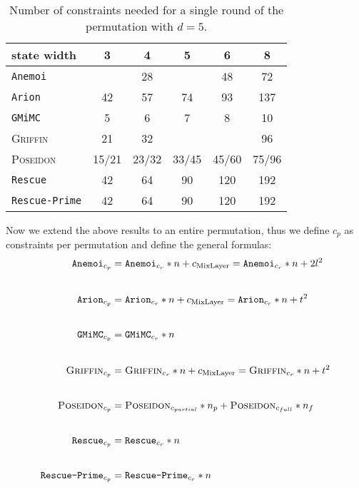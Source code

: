 \documentclass[12pt, a4paper]{report}
\begin{document}
\begin{table}[H]
  \caption{Number of constraints needed for a single round of the permutation with $d = 5$.}\label{tab:constraintsround}
  \begin{center}
    \begin{tabular}{|l|c|c|c|c|c|}
      \hline
        state width & 3 & 4 & 5 & 6 & 8 \\
      \hline
        \texttt{Anemoi} & & 28 &  & 48 & 72 \\
        \texttt{Arion} & 42 & 57 & 74 & 93 & \cellcolor{orange!35} 137 \\
        \texttt{GMiMC} & \cellcolor{green!35} 5 & 6 & 7 & 8 & 10 \\
        \textsc{Griffin} & 21 & 32 & & & 96 \\
        \textsc{Poseidon} & 15/21 & 23/32 & 33/45 & 45/60 & 75/96 \\
        \texttt{Rescue} & 42 & 64 & 90 & \cellcolor{orange!35} 120 & \cellcolor{red!35} 192 \\
        \texttt{Rescue-Prime} & 42 & 64 & 90 & \cellcolor{orange!35} 120 & \cellcolor{red!35} 192 \\
      \hline
    \end{tabular}
  \end{center}
\end{table}

Now we extend the above results to an entire permutation, thus we define $c_p$ as constraints per permutation and define the general formulas:
\begin{align*}
  \texttt{Anemoi}_{c_p} &= \texttt{Anemoi}_{c_r} * n + c_{\text{MixLayer}} = \texttt{Anemoi}_{c_r} * n + 2l^2 \\[20pt]
  \texttt{Arion}_{c_p} &= \texttt{Arion}_{c_r} * n + c_{\text{MixLayer}} = \texttt{Arion}_{c_r} * n + t^2 \\[20pt]
  \texttt{GMiMC}_{c_p} &= \texttt{GMiMC}_{c_r} * n \\[20pt]
  \textsc{Griffin}_{c_p} &= \textsc{Griffin}_{c_r} * n + c_{\text{MixLayer}} = \textsc{Griffin}_{c_r} * n + t^2 \\[20pt]
  \textsc{Poseidon}_{c_p} &= \textsc{Poseidon}_{c_{partial}} * n_p + \textsc{Poseidon}_{c_{full}} * n_f \\[20pt]
  \texttt{Rescue}_{c_p} &= \texttt{Rescue}_{c_r} * n \\[20pt]
  \texttt{Rescue-Prime}_{c_p} &= \texttt{Rescue-Prime}_{c_r} * n
\end{align*}
\end{document}
